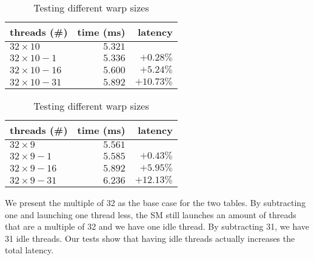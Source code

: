 \begin{table}[htb]%
  \begin{minipage}{0.49\linewidth}
    \centering
    \begin{tabular}{lrr}
      \toprule
      threads (\#) & time (ms) & latency \\
      \midrule
      $32 \times 10$    & $5.321$ &          \\
      $32 \times 10-1$  & $5.336$ & $+0.28\%$  \\
      $32 \times 10-16$ & $5.600$ & $+5.24\%$  \\
      $32 \times 10-31$ & $5.892$ & $+10.73\%$ \\
      \bottomrule
    \end{tabular}
  \end{minipage}%
  \begin{minipage}{0.49\linewidth}
    \centering
    \begin{tabular}{lrr}
      \toprule
      threads (\#) & time (ms) & latency \\
      \midrule
      $32 \times 9$     & $5.561$ & \\
      $32 \times 9-1$   & $5.585$ & $+0.43\%$  \\
      $32 \times 9-16$  & $5.892$ & $+5.95\%$  \\
      $32 \times 9-31$  & $6.236$ & $+12.13\%$ \\
      \bottomrule
    \end{tabular}
  \end{minipage}%
  \caption{Testing different warp sizes}
  \label{tab:warp size testing}
\end{table}

We present the multiple of 32 as the base case for the two tables.
By subtracting one and launching one thread less, the SM still launches an amount of threads that are a multiple of 32 and we have one idle thread.
By subtracting 31, we have 31 idle threads.
Our tests show that having idle threads actually increases the total latency.

